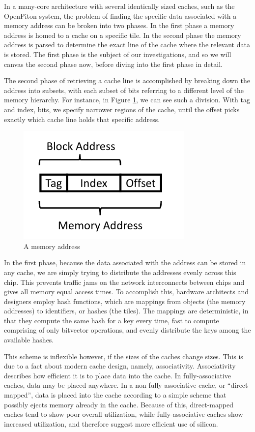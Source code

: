 In a many-core architecture with several identically sized caches, such as the
OpenPiton system, the problem of finding the specific data associated with a
memory address can be broken into two phases.  In the first phase a memory
address is homed to a cache on a specific tile.  In the second phase the memory
address is parsed to determine the exact line of the cache where the relevant
data is stored.  The first phase is the subject of our investigations, and so we
will canvas the second phase now, before diving into the first phase in detail.

The second phase of retrieving a cache line is accomplished by breaking down the
address into subsets, with each subset of bits referring to a different level of
the memory hierarchy.  For instance, in Figure \ref{Fig:memory_addr}, we can see
such a division.  With tag and index, bits, we specify narrower regions of the
cache, until the offset picks exactly which cache line holds that specific
address.

\begin{figure}[h]
  \centering
  \includegraphics[scale=0.4]{memory_addr.png}
  \caption{A memory address}
  \label{Fig:memory_addr}
\end{figure}

In the first phase, because the data associated with the address can be stored
in any cache, we are simply trying to distribute the addresses evenly across
this chip.  This prevents traffic jams on the network interconnects between
chips and gives all memory equal access times.  To accomplish this, hardware
architects and designers employ hash functions, which are mappings from objects
(the memory addresses) to identifiers, or hashes (the tiles).  The mappings are
deterministic, in that they compute the same hash for a key every time, fast to
compute comprising of only bitvector operations, and evenly distribute the keys
among the available hashes.

This scheme is inflexible however, if the sizes of the caches change sizes.
This is due to a fact about modern cache design, namely, associativity.
Associativity describes how efficient it is to place data into the cache.  In
fully-associative caches, data may be placed anywhere.  In a
non-fully-associative cache, or ``direct-mapped'', data is placed into the cache
according to a simple scheme that possibly ejects memory already in the cache.
Because of this, direct-mapped caches tend to show poor overall utilization,
while fully-associative caches show increased utilization, and therefore suggest
more efficient use of silicon.

